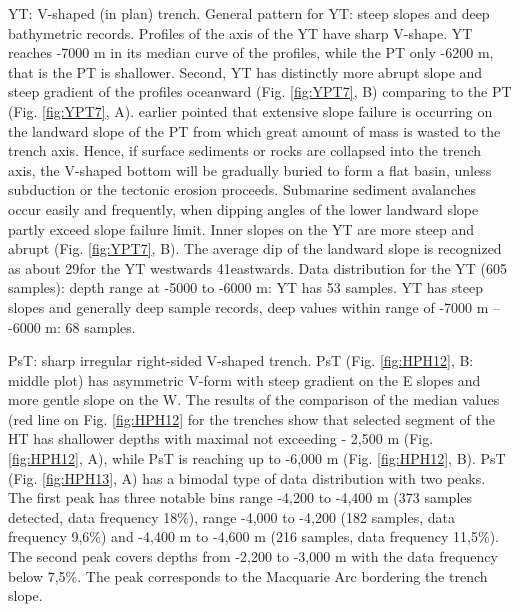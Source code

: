 \documentclass[11pt,a4paper]{report}
\begin{document}
{\ac{YT}: V-shaped (in plan) trench. General pattern for \ac{YT}: steep slopes and deep bathymetric records. Profiles of the axis of the \ac{YT} have sharp V-shape. \ac{YT} reaches -7000 m in its median curve of the profiles, while the \ac{PT} only -6200 m, that is the \ac{PT} is shallower. Second, \ac{YT} has distinctly more abrupt slope and steep gradient of the profiles oceanward (Fig. \ref{fig:YPT7}, B) comparing to the \ac{PT} (Fig. \ref{fig:YPT7}, A). \cite{Kobayashietal1997} earlier pointed that extensive slope failure is occurring on the landward slope of the \ac{PT} from which great amount of mass is wasted to the trench axis. Hence, if surface sediments or rocks are collapsed into the trench axis, the V-shaped bottom will be gradually buried to form a flat basin, unless subduction or the tectonic erosion proceeds. Submarine sediment avalanches occur easily and frequently, when dipping angles of the lower landward slope partly exceed slope failure limit. Inner slopes on the \ac{YT} are more steep and abrupt (Fig. \ref{fig:YPT7}, B). The average dip of the landward slope is recognized as about 29\degree for the \ac{YT} westwards 41\degree eastwards. Data distribution for the \ac{YT} (605 samples): depth range at -5000 to -6000 m: \ac{YT} has 53 samples. \ac{YT} has steep slopes and generally deep sample records, deep values within range of -7000 m -- -6000 m: 68 samples.

\ac{PsT}: sharp irregular right-sided V-shaped trench. \ac{PsT} (Fig. \ref{fig:HPH12}, B: middle plot) has asymmetric V-form with steep gradient on the E slopes and more gentle slope on the W. The results of the comparison of the median values (red line on Fig. \ref{fig:HPH12} for the trenches show that selected segment of the \ac{HT} has shallower depths with maximal not exceeding - 2,500 m (Fig. \ref{fig:HPH12}, A), while \ac{PsT} is reaching up to -6,000 m (Fig. \ref{fig:HPH12}, B). \ac{PsT} (Fig. \ref{fig:HPH13}, A) has a bimodal type of data distribution with two peaks. The first peak has three notable bins range -4,200 to -4,400 m (373 samples detected, data frequency 18\%), range -4,000 to -4,200 (182 samples, data frequency 9,6\%) and -4,400 m to -4,600 m (216 samples, data frequency 11,5\%). The second peak covers depths from -2,200 to -3,000 m with the data frequency below 7,5\%. The peak corresponds to the Macquarie Arc bordering the trench slope. 

}
\end{document}
